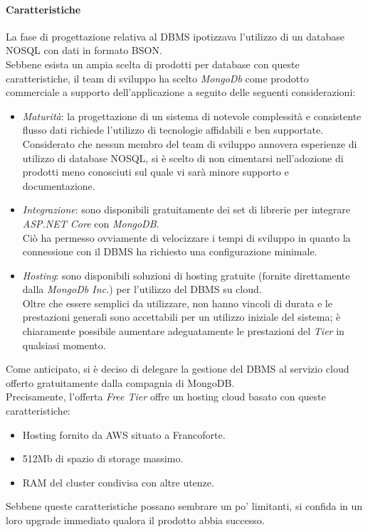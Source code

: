 \documentclass[12pt]{article}
\begin{document}
\paragraph{Caratteristiche}
La fase di progettazione relativa al DBMS ipotizzava l'utilizzo di un database NOSQL con dati in formato BSON.\\
Sebbene esista un ampia scelta di prodotti per database con queste caratteristiche, il team di sviluppo ha scelto \textit{MongoDb} come prodotto commerciale a supporto dell'applicazione a seguito delle seguenti considerazioni: 
\begin{itemize}
\item \textit{Maturità}: la progettazione di un sistema di notevole complessità e consistente flusso dati richiede l'utilizzo di tecnologie affidabili e ben supportate.\\
Considerato che nessun membro del team di sviluppo annovera esperienze di utilizzo di database NOSQL, si è scelto di non cimentarsi nell'adozione di prodotti meno conosciuti sul quale vi sarà minore supporto e documentazione.
\item \textit{Integrazione}: sono disponibili gratuitamente dei set di librerie per integrare \textit{ASP.NET Core} con \textit{MongoDB}.\\
Ciò ha permesso ovviamente di velocizzare i tempi di sviluppo in quanto la connessione con il DBMS ha richiesto una configurazione minimale.
\item \textit{Hosting}: sono disponibili soluzioni di hosting gratuite (fornite direttamente dalla \textit{MongoDb Inc.}) per l'utilizzo del DBMS su cloud.\\
Oltre che essere semplici da utilizzare, non hanno vincoli di durata e le prestazioni generali sono accettabili per un utilizzo iniziale del sistema; è chiaramente possibile aumentare adeguatamente le prestazioni del \textit{Tier} in qualsiasi momento.
\end{itemize}
Come anticipato, si è deciso di delegare la gestione del DBMS al servizio cloud offerto gratuitamente dalla compagnia di MongoDB.\\
Precisamente, l'offerta \textit{Free Tier} offre un hosting cloud basato con queste caratteristiche:
\begin{itemize}
\item Hosting fornito da AWS situato a Francoforte.
\item 512Mb di spazio di storage massimo.
\item RAM del cluster condivisa con altre utenze.
\end{itemize}
Sebbene queste caratteristiche possano sembrare un po' limitanti, si confida in un loro upgrade immediato qualora il prodotto abbia successo.
\end{document}
